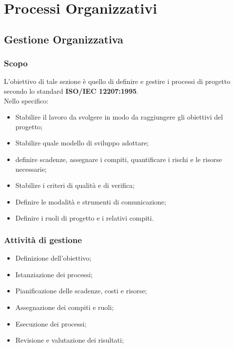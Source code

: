 \section{Processi Organizzativi}
    \subsection{Gestione Organizzativa}
        \subsubsection{Scopo}
            L'obiettivo di tale sezione è quello di definire e gestire i processi di progetto secondo lo standard \textbf{ISO/IEC 12207:1995}. \\
            Nello specifico:
            \begin{itemize}
                \item Stabilire il lavoro da svolgere in modo da raggiungere gli obiettivi del progetto;
                \item Stabilire quale modello di sviluppo adottare;
                \item definire scadenze, assegnare i compiti, quantificare i rischi e le risorse necessarie;
                \item Stabilire i criteri di qualità e di verifica;
                \item Definire le modalità e strumenti di comunicazione;
                \item Definire i ruoli di progetto e i relativi compiti.
            \end{itemize}

        \subsubsection{Attività di gestione}
            \begin{itemize}
                \item Definizione dell'obiettivo;
                \item Istanziazione dei processi;
                \item Pianificazione delle scadenze, costi e risorse;
                \item Assegnazione dei compiti e ruoli;
                \item Esecuzione dei processi;
                \item Revisione e valutazione dei risultati;
            \end{itemize}

